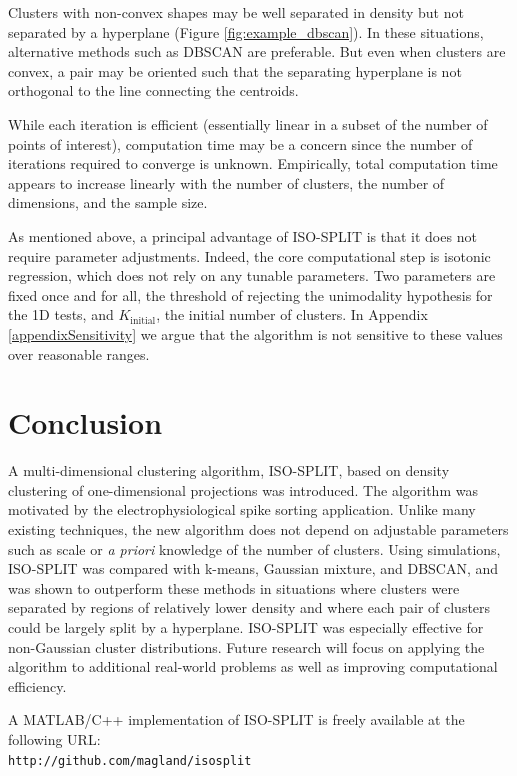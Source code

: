 \documentclass[10pt]{article}
\begin{document}
Clusters with non-convex shapes may be well separated in density but not separated by a hyperplane (Figure \ref{fig:example_dbscan}). In these situations, alternative methods such as DBSCAN are preferable. But even when clusters are convex, a pair may be oriented such that the separating hyperplane is not orthogonal to the line connecting the centroids.

While each iteration is efficient (essentially linear in a subset of the number of points of interest), computation time may be a concern since the number of iterations required to converge is unknown. Empirically, total computation time appears to increase linearly with the number of clusters, the number of dimensions, and the sample size.

As mentioned above, a principal advantage of ISO-SPLIT is that it does not require parameter adjustments. Indeed, the core computational step is isotonic regression, which does not rely on any tunable parameters. Two parameters are fixed once and for all, the threshold of rejecting the unimodality hypothesis for the 1D tests, and $K_\text{initial}$, the initial number of clusters. In Appendix \ref{appendixSensitivity} we argue that the algorithm is not sensitive to these values over reasonable ranges.

\section{Conclusion}
\label{s:conc}

A multi-dimensional clustering algorithm, ISO-SPLIT, based on density clustering of one-dimensional projections was introduced. The algorithm was motivated by the electrophysiological spike sorting application. Unlike many existing techniques, the new algorithm does not depend on adjustable parameters such as scale or \emph{a priori} knowledge of the number of clusters. Using simulations, ISO-SPLIT was compared with k-means, Gaussian mixture, and DBSCAN, and was shown to outperform these methods in situations where clusters were separated by regions of relatively lower density and where each pair of clusters could be largely split by a hyperplane. ISO-SPLIT was especially effective for non-Gaussian cluster distributions. Future research will focus on applying the algorithm to additional real-world problems as well as improving computational efficiency.

A MATLAB/C++ implementation of ISO-SPLIT is freely available
at the following URL:\\
{\tt http://github.com/magland/isosplit}
\end{document}
